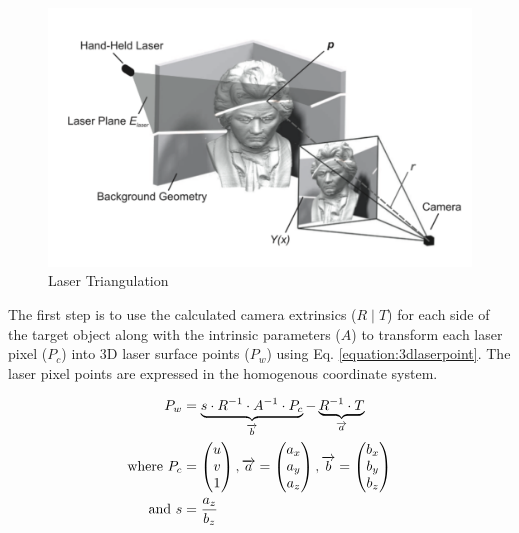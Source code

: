 \begin{figure}[ht!]
\centering
\includegraphics[width=1.0\linewidth]{figures/pointcloudpaper}
\caption{Laser Triangulation \cite{winkelbach:2006}}
\label{figure:triangulation}
\end{figure}

The first step is to use the calculated camera extrinsics ($R \mid T$) for
each side of the target object along with the intrinsic parameters ($A$) to
transform each laser pixel ($P_c$) into 3D laser surface points ($P_w$) using
Eq. \ref{equation:3dlaserpoint}. The laser pixel points are expressed in
the homogenous coordinate system.

\begin{align}
	\label{equation:3dlaserpoint}
	P_w &= 	\underbrace{s \cdot R^{-1}
 					 							\cdot A^{-1}
 												\cdot P_c
										 }_\text{$\overrightarrow{b}$}
					-
					\underbrace{
											R^{-1} \cdot T
										 }_\text{$\overrightarrow{a}$} \\
	\text{where}~
	P_c &= \begin{pmatrix}
						u \\
						v \\
						1 \\
				 \end{pmatrix},
	\overrightarrow{a} = \begin{pmatrix}
													a_x \\
													a_y \\
													a_z \\
												\end{pmatrix},
	\overrightarrow{b} = \begin{pmatrix}
													b_x \\
													b_y \\
													b_z \\
												\end{pmatrix} \notag \\
  \text{and}~ s &= \frac{a_z}{b_z} \notag
\end{align}

